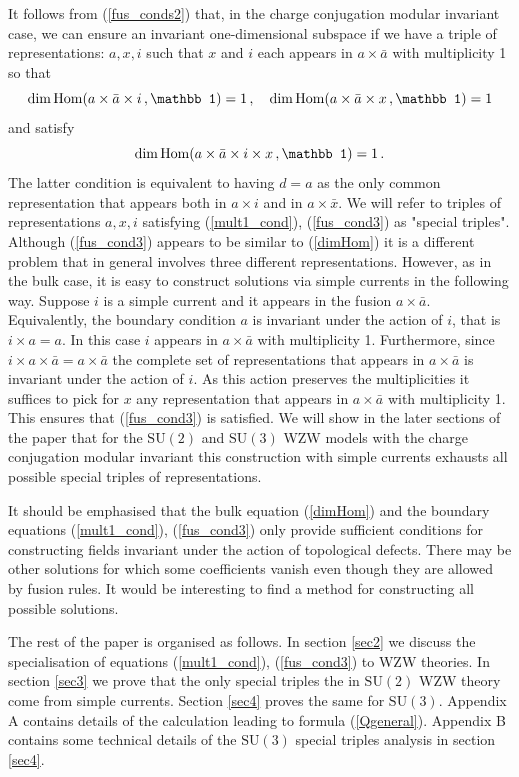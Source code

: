 \documentclass[a4paper,11pt]{article}
\theoremstyle{plain}
\theoremstyle{definition}
\def\be{\begin{equation}}
\def\ee{\end{equation}}
\begin{document}
It follows from (\ref{fus_conds2}) that, in the charge conjugation modular invariant case, we can ensure an invariant one-dimensional subspace if we have a triple of representations: $a,x,i$ such that $x$ and $i$ each appears in $a\times \bar a$ with multiplicity 1 so that 
\be \label{mult1_cond}
{\rm dim}\, {\rm Hom}(a\times \bar a \times i \,  , {\mathbb 1}) = 1 \, , \quad {\rm dim}\, {\rm Hom}(a\times \bar a \times  x\, , {\mathbb 1}) = 1 
\ee
and satisfy 
\be \label{fus_cond3}
{\rm dim}\, {\rm Hom}(a\times \bar a \times i \times  x\, , {\mathbb 1}) = 1 \, .
\ee
The latter condition is equivalent to having $d=a$  as the only common representation that appears both in $a\times  i$ and in $a\times  \bar{x}$. 
We will refer to triples of representations $a,x,i$ satisfying (\ref{mult1_cond}), (\ref{fus_cond3}) as "special triples". 
Although (\ref{fus_cond3}) appears to be similar to (\ref{dimHom}) it is a different problem that in general involves three different representations. 
However, as in the bulk case, it is easy to construct solutions via simple currents in the following way. Suppose $i$ is a simple current and it appears in the fusion $a\times \bar{a}$. Equivalently, the boundary condition $a$ is invariant under the action of $i$, that is $i\times a=a$. In this case  $i$ appears in $a\times \bar a$ with multiplicity 1. Furthermore, since $i\times a \times \bar a  = a \times \bar a$ 
the complete set of representations that appears in $a\times \bar{a}$ is invariant under the action of $i$. As this action preserves the multiplicities 
it suffices to pick for $x$ any representation that appears in $a\times \bar a$ with multiplicity 1. This ensures that (\ref{fus_cond3}) is satisfied. 
We will show in the later sections of the paper that for the $\mathrm{SU(2)}$ and $\mathrm{SU(3)}$ WZW models with the charge conjugation modular invariant 
 this construction with simple currents exhausts all possible special triples of representations. 

It should be emphasised that the bulk equation (\ref{dimHom}) and the boundary equations (\ref{mult1_cond}), (\ref{fus_cond3}) only provide 
sufficient conditions for constructing fields invariant under the action of topological  defects. There may be other solutions for which some coefficients 
vanish even though they are allowed by fusion rules. It would be interesting to find a method for constructing all possible solutions. 

The rest of the paper is organised as follows. In section \ref{sec2} we discuss the specialisation of equations (\ref{mult1_cond}), (\ref{fus_cond3}) to WZW 
theories.  In section \ref{sec3} we prove that the only special triples the in $\mathrm{SU(2)}$ WZW theory come from simple currents. 
Section \ref{sec4} proves the same for $\mathrm{SU(3)}$. Appendix A contains details of the calculation leading to formula (\ref{Qgeneral}). Appendix B contains some technical details 
of the $\mathrm{SU(3)}$ special triples  analysis in section \ref{sec4}.
\end{document}
